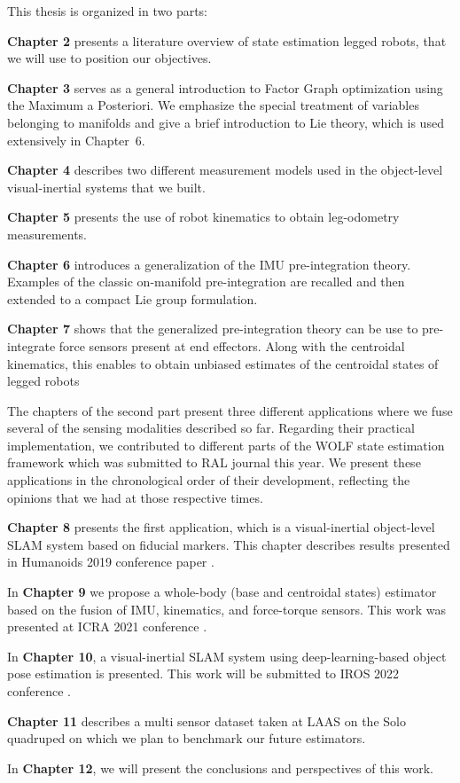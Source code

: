 This thesis is organized in two parts:

\bigskip
\textbf{Chapter 2} presents a literature overview of state estimation legged robots, that we will use to position our objectives.

\bigskip
\textbf{Chapter 3} serves as a general introduction to Factor Graph optimization using the Maximum a Posteriori. We emphasize the special treatment of variables 
belonging to manifolds and give a brief introduction to Lie theory, which is used extensively in \mbox{Chapter 6}.

\bigskip
\textbf{Chapter 4} describes two different measurement models used in the object-level visual-inertial systems that we built. 

\bigskip
\textbf{Chapter 5} presents the use of robot kinematics to obtain leg-odometry measurements. 

\bigskip
\textbf{Chapter 6} introduces a generalization of the IMU pre-integration theory. Examples of the classic on-manifold pre-integration are recalled and 
then extended to a compact Lie group formulation. 

\bigskip
\textbf{Chapter 7} shows that the generalized pre-integration theory can be use to pre-integrate force sensors present at end effectors.
Along with the centroidal kinematics, this enables to obtain unbiased estimates of the centroidal states of legged robots

\bigskip
The chapters of the second part present three different applications where we fuse several of the sensing modalities described so far.
Regarding their practical implementation, we contributed to different parts of the WOLF state estimation framework \cite{sola2021wolf} which was 
submitted to RAL journal this year. We present these applications in the chronological order of their development, reflecting the opinions that
we had at those respective times.

\bigskip
\textbf{Chapter 8} presents the first application, which is a visual-inertial object-level SLAM system based on fiducial markers. This chapter describes
results presented in Humanoids 2019 conference paper \cite{fourmy2019absolute}.

\bigskip
In \textbf{Chapter 9} we propose a whole-body (base and centroidal states) estimator based on the fusion of IMU, kinematics, and force-torque sensors. This
work was presented at ICRA 2021 conference \cite{fourmy2021contact}.

\bigskip
In \textbf{Chapter 10}, a visual-inertial SLAM system using deep-learning-based object pose estimation is presented. This work will be submitted to IROS 2022 conference \cite{debeunne2021cosyslam}.

\bigskip
\textbf{Chapter 11} describes a multi sensor dataset taken at LAAS on the Solo quadruped on which we plan to benchmark our future estimators.

\bigskip
In \textbf{Chapter 12}, we will present the conclusions and perspectives of this work.



